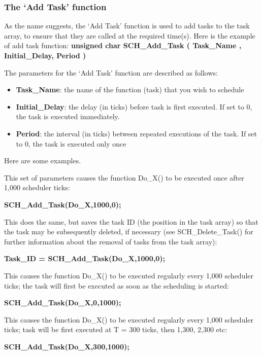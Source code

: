 \documentclass[twoside, final]{hcmut_report}
\begin{document}
\subsubsection{The ‘Add Task’ function}
As the name suggests, the ‘Add Task’ function is used to add tasks to the task array, to
ensure that they are called at the required time(s).
Here is the example of add task function: 
\textbf{unsigned   char   SCH\_Add\_Task ( Task\_Name  , Initial\_Delay, Period )}

The parameters for the ‘Add Task’ function are described as follows:
\begin{itemize}
    \item \textbf{Task\_Name}: the name of the function (task) that you wish to schedule 
    \item \textbf{Initial\_Delay}: the delay (in ticks) before task is first executed. If set to 0,
the task is executed immediately.
    \item \textbf{Period}: the interval (in ticks) between repeated executions of the task. If set to 0, the task is executed only once
    
\end{itemize}

Here are some examples.

This set of parameters causes the function Do\_X() to be executed once after 1,000
scheduler ticks:

\textbf{SCH\_Add\_Task(Do\_X,1000,0);}

This does the same, but saves the task ID (the position in the task array) so that the
task may be subsequently deleted, if necessary (see SCH\_Delete\_Task() for further
information about the removal of tasks from the task array):

\textbf{Task\_ID = SCH\_Add\_Task(Do\_X,1000,0);}

This causes the function Do\_X() to be executed regularly every 1,000 scheduler ticks;
the task will first be executed as soon as the scheduling is started:


\textbf{SCH\_Add\_Task(Do\_X,0,1000);}

This causes the function Do\_X() to be executed regularly every 1,000 scheduler
ticks; task will be first executed at T = 300 ticks, then 1,300, 2,300 etc:

\textbf{SCH\_Add\_Task(Do\_X,300,1000);}
\end{document}
